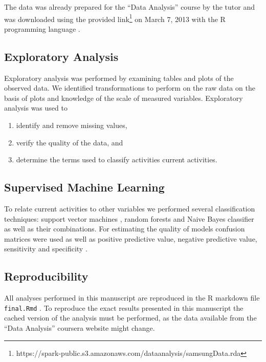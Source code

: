 \documentclass[a4paper,12pt]{extarticle}
\begin{document}
The data was already prepared for the ``Data Analysis'' course by the tutor and was downloaded using the provided link\footnote{https://spark-public.s3.amazonaws.com/dataanalysis/samsungData.rda} on March 7, 2013 with the R programming language \cite{source:r-language}.


\subsection{Exploratory Analysis}

Exploratory analysis was performed by examining tables and plots of the observed data. We identified transformations to perform on the raw data on the basis of plots and knowledge of the scale of measured variables. Exploratory analysis was used to

\begin{enumerate}
  \item identify and remove missing values,
  \item verify the quality of the data, and
  \item determine the terms used to classify activities current activities.
\end{enumerate}

\subsection{Supervised Machine Learning}

To relate current activities to other variables we performed several classification techniques: support vector machines \cite{sourse:dminr.svm}, random forests \cite{sourse:rblogger.classification} and Naive Bayes classifier \cite{sourse:dminr.naivebayes} as well as their combinations. For estimating the quality of models confusion matrices were used as well as positive predictive value, negative predictive value, sensitivity and specificity \cite{source:wiki.estimates}.


\subsection{Reproducibility}

All analyses performed in this manuscript are reproduced in the R markdown file \texttt{final.Rmd} \cite{source:r-markdown}. To reproduce the exact results presented in this manuscript the cached version of the analysis must be performed, as the data available from the ``Data Analysis'' coursera website might change.
\end{document}
